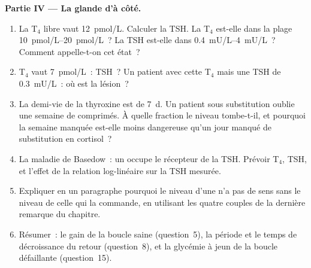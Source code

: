 \begin{problem}
\medskip
\noindent\textbf{Partie IV --- La glande d'à côté.}
\begin{enumerate}[resume]
  \item La T$_{4}$ libre vaut \qty{12}{pmol/L}. Calculer la TSH. La
        T$_{4}$ est-elle dans la plage \qtyrange{10}{20}{pmol/L}~? La TSH
        est-elle dans \qtyrange{0.4}{4}{mU/L}~? Comment appelle-t-on cet
        état~?
  \item T$_{4}$ vaut \qty{7}{pmol/L}~: TSH~? Un patient avec cette
        T$_{4}$ mais une TSH de \qty{0.3}{mU/L}~: où est la lésion~?
  \item La demi-vie de la thyroxine est de \qty{7}{d}. Un patient sous
        substitution oublie une semaine de comprimés. À quelle fraction
        le niveau tombe-t-il, et pourquoi la semaine manquée est-elle
        moins dangereuse qu'un jour manqué de substitution en cortisol~?
  \item La maladie de Basedow~: un  occupe le récepteur de la
        TSH. Prévoir T$_{4}$, TSH, et l'effet de la relation log-linéaire
        sur la TSH mesurée.
  \item Expliquer en un paragraphe pourquoi le niveau d'une  n'a
        pas de sens sans le niveau de celle qui la commande, en utilisant
        les quatre couples de la dernière remarque du chapitre.
  \item Résumer~: le gain de la boucle saine (question~5), la période et
        le temps de décroissance du retour (question~8), et la glycémie à
        jeun de la boucle défaillante (question~15).
\end{enumerate}
\end{problem}
